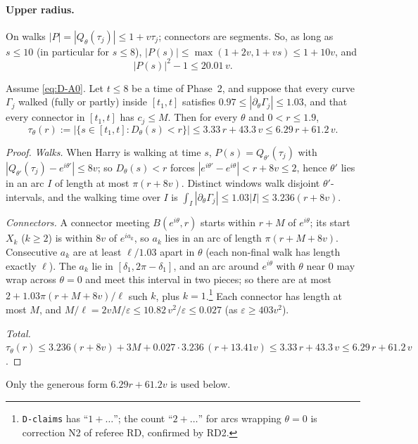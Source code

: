 \paragraph{Upper radius.}
On walks $|P|=|Q_\theta(\tau_j)|\le1+v\tau_j$; connectors are segments. So, as long as $s\le10$ (in particular for $s\le8$),
$|P(s)|\le\max(1+2v,1+vs)\le1+10v$, and
\begin{equation}\label{eq:D-upper}
|P(s)|^2-1\le20.01\,v .
\end{equation}

\begin{lemma}\label{lem:D-time}
Assume \eqref{eq:D-A0}. Let $t\le8$ be a time of Phase~2, and suppose that every curve $\Gamma_j$ walked (fully or partly)
inside $[t_1,t]$ satisfies $0.97\le|\partial_\theta\Gamma_j|\le1.03$, and that every connector in $[t_1,t]$ has $c_j\le M$.
Then for every $\theta$ and $0<r\le1.9$,
\begin{equation}\label{eq:D-time}
\tau_\theta(r):=\bigl|\{s\in[t_1,t]:D_\theta(s)<r\}\bigr|\le3.33\,r+43.3\,v\le6.29\,r+61.2\,v .
\end{equation}
\end{lemma}
\begin{proof}
\emph{Walks.} When Harry is walking at time $s$, $P(s)=Q_{\theta'}(\tau_j)$ with $|Q_{\theta'}(\tau_j)-e^{i\theta'}|\le8v$; so
$D_\theta(s)<r$ forces $|e^{i\theta'}-e^{i\theta}|<r+8v\le2$, hence $\theta'$ lies in an arc $I$ of length at most $\pi(r+8v)$.
Distinct windows walk disjoint $\theta'$-intervals, and the walking time over $I$ is
$\int_I|\partial_\theta\Gamma_j|\le1.03|I|\le3.236(r+8v)$.

\emph{Connectors.} A connector meeting $B(e^{i\theta},r)$ starts within $r+M$ of $e^{i\theta}$; its start $X_k$ ($k\ge2$) is
within $8v$ of $e^{ia_k}$, so $a_k$ lies in an arc of length $\pi(r+M+8v)$. Consecutive $a_k$ are at least $\ell/1.03$ apart
in $\theta$ (each non-final walk has length exactly $\ell$). The $a_k$ lie in $[\delta_1,2\pi-\delta_1]$, and an arc around
$e^{i\theta}$ with $\theta$ near $0$ may wrap across $\theta=0$ and meet this interval in two pieces; so there are at most
$2+1.03\pi(r+M+8v)/\ell$ such $k$, plus $k=1$.\footnote{\texttt{D-claims} has ``$1+\dots$''; the count ``$2+\dots$'' for arcs
wrapping $\theta=0$ is correction N2 of referee RD, confirmed by RD2.} Each connector has length at most $M$, and
$M/\ell=2vM/\varepsilon\le10.82\,v^2/\varepsilon\le0.027$ (as $\varepsilon\ge403v^2$).

\emph{Total.} $\tau_\theta(r)\le3.236(r+8v)+3M+0.027\cdot3.236\,(r+13.41v)\le3.33\,r+43.3\,v\le6.29\,r+61.2\,v$.
\end{proof}
Only the generous form $6.29r+61.2v$ is used below.


